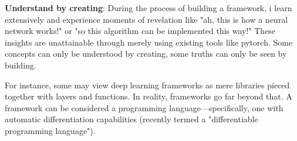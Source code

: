 \documentclass{article}
\newcommand{\secs}[1]{\section*{#1}}
\begin{document}
\noindent\textbf{Understand by creating}: During the process of building a framework, i learn extensively and experience moments of revelation like "ah, this is how a neural network works!" or "so this algorithm can be implemented this way!" These insights are unattainable through merely using existing tools like pytorch. Some concepts can only be understood by creating, some truths can only be seen by building. 

For instance, some may view deep learning frameworks as mere libraries pieced together with layers and functions. In reality, frameworks go far beyond that. A framework can be considered a programming language—specifically, one with automatic differentiation capabilities (recently termed a "differentiable programming language").
















\end{document}
